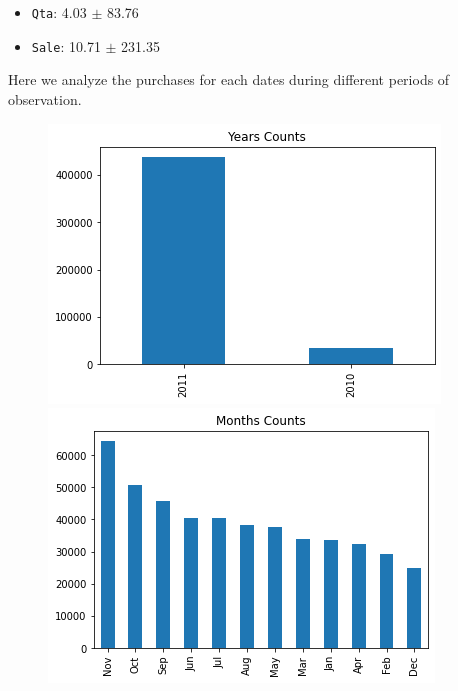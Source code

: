 \documentclass[12pt]{article}
\begin{document}
\begin{itemize}
    \item \texttt{Qta}: 4.03 $\pm$ 83.76 
    \item \texttt{Sale}: 10.71 $\pm$ 231.35
\end{itemize}

Here we analyze the purchases for each dates during different periods of observation.

\begin{figure}[!h]
  \includegraphics[width=\linewidth]{images/data1.png}
  \label{fig:data1}
\endminipage\hfill
{}
  \includegraphics[width=\linewidth]{images/data2.png}
  \label{fig:data2}
\endminipage\hfill
{}%

\end{figure}
\end{document}

